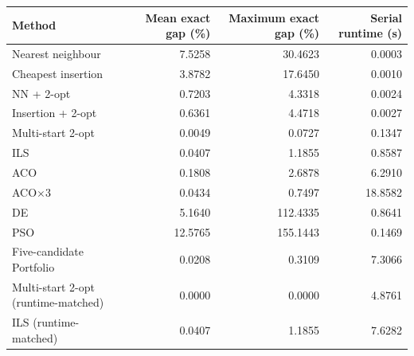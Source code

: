 \begin{tabular}{lrrr}
\toprule
Method & Mean exact gap (\%) & Maximum exact gap (\%) & Serial runtime (s) \\
\midrule
Nearest neighbour & 7.5258 & 30.4623 & 0.0003 \\
Cheapest insertion & 3.8782 & 17.6450 & 0.0010 \\
NN + 2-opt & 0.7203 & 4.3318 & 0.0024 \\
Insertion + 2-opt & 0.6361 & 4.4718 & 0.0027 \\
Multi-start 2-opt & 0.0049 & 0.0727 & 0.1347 \\
ILS & 0.0407 & 1.1855 & 0.8587 \\
ACO & 0.1808 & 2.6878 & 6.2910 \\
ACO$\times$3 & 0.0434 & 0.7497 & 18.8582 \\
DE & 5.1640 & 112.4335 & 0.8641 \\
PSO & 12.5765 & 155.1443 & 0.1469 \\
Five-candidate Portfolio & 0.0208 & 0.3109 & 7.3066 \\
Multi-start 2-opt (runtime-matched) & 0.0000 & 0.0000 & 4.8761 \\
ILS (runtime-matched) & 0.0407 & 1.1855 & 7.6282 \\
\bottomrule
\end{tabular}
